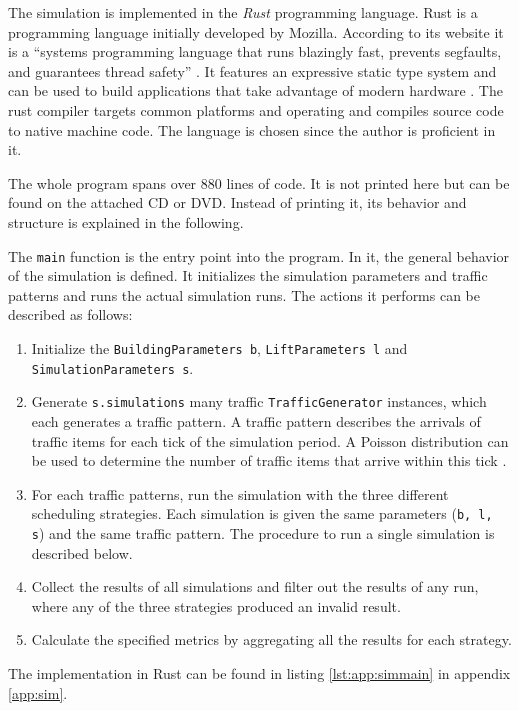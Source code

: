 The simulation is implemented in the \emph{Rust} programming language.
Rust is a programming language initially developed by Mozilla.
According to its website it is a \enquote{systems programming language that runs blazingly fast, prevents segfaults, and guarantees thread safety} \autocite{rust2018rust}.
It features an expressive static type system and can be used to build applications that take advantage of modern hardware
\autocite[][]{matsakis2014rust}.
The rust compiler targets common platforms and operating and compiles source code to native machine code.
The language is chosen since the author is proficient in it.

The whole program spans over 880 lines of code.
It is not printed here but can be found on the attached CD or DVD.
Instead of printing it, its behavior and structure is explained in the following.

The \texttt{main} function is the entry point into the program.
In it, the general behavior of the simulation is defined.
It initializes the simulation parameters and traffic patterns and runs the actual simulation runs.
The actions it performs can be described as follows:
\begin{enumerate}
    \item Initialize the \texttt{BuildingParameters b}, \texttt{LiftParameters l} and\\ \texttt{SimulationParameters s}.
    \item Generate \texttt{s.simulations} many traffic \texttt{TrafficGenerator} instances, which each generates a traffic pattern. A traffic pattern describes the arrivals of traffic items for each tick of the simulation period. A Poisson distribution can be used to determine the number of traffic items that arrive within this tick \autocite{beers2015arrivals}.
    \item For each traffic patterns, run the simulation with the three different scheduling strategies. Each simulation is given the same parameters (\texttt{b, l, s}) and the same traffic pattern. The procedure to run a single simulation is described below.
    \item Collect the results of all simulations and filter out the results of any run, where any of the three strategies produced an invalid result.
    \item Calculate the specified metrics by aggregating all the results for each strategy.
\end{enumerate}
The implementation in Rust can be found in listing \ref{lst:app:simmain} in appendix \ref{app:sim}.

